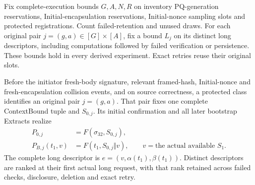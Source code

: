 Fix complete-execution bounds $G,A,N,R$ on inventory PQ-generation
reservations, Initial-encapsulation reservations, Initial-nonce sampling
slots and protected registrations. Count failed-retention and unused
draws. For each original pair $j=(g,a)\in[G]\times[A]$, fix a bound
$L_j$ on its distinct long descriptors, including computations followed
by failed verification or persistence. These bounds hold in every derived
experiment. Exact retries reuse their original slots.

\begin{lemma}
\label{lem:bootstrap-initial-origin}
Before the initiator fresh-body signature, relevant framed-hash,
Initial-nonce and fresh-encapsulation collision events, and on source
correctness, a protected class identifies an original pair $j=(g,a)$.
That pair fixes one complete ContextBound tuple and $S_{0,j}$. Its
initial confirmation and all later bootstrap Extracts realize
\begin{equation}
 \begin{aligned}
 P_{0,j}&=F(\sigma_{32},S_{0,j}),\\
 P_{B,j}(t_1,v)&=F(t_1,S_{0,j}\Vert v),
       \qquad v=\text{the actual available }S_1.
 \end{aligned}
 \label{eq:bootstrap-initial-service}
\end{equation}
The complete long descriptor is
$e=(v,\alpha(t_1),\beta(t_1))$. Distinct descriptors are ranked at their
first actual long request, with that rank retained across failed checks,
disclosure, deletion and exact retry.
\end{lemma}
